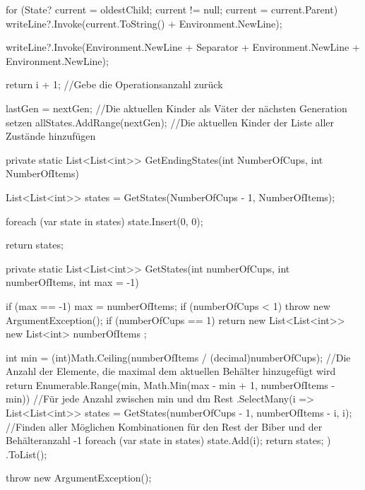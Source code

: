 \documentclass[a4paper,10pt,ngerman]{scrartcl}
\begin{document}
\begin{lstcs}
{{{{{                        for (State? current = oldestChild; current != null; current = current.Parent)
                        {
                            writeLine?.Invoke(current.ToString() + Environment.NewLine);
                        }
                    }

                    writeLine?.Invoke(Environment.NewLine + Separator + Environment.NewLine + Environment.NewLine);

                    return i + 1;               //Gebe die Operationsanzahl zurück
                }

                lastGen = nextGen;               //Die aktuellen Kinder als Väter der nächsten Generation setzen
                allStates.AddRange(nextGen);    //Die aktuellen Kinder der Liste aller Zustände hinzufügen
            }
        }

        private static List<List<int>> GetEndingStates(int NumberOfCups, int NumberOfItems)
        {
            List<List<int>> states = GetStates(NumberOfCups - 1, NumberOfItems);

            foreach (var state in states) state.Insert(0, 0);

            return states;
        }

        private static List<List<int>> GetStates(int numberOfCups, int numberOfItems, int max = -1)
        {
            if (max == -1) max = numberOfItems;
            if (numberOfCups < 1) throw new ArgumentException();
            if (numberOfCups == 1) return new List<List<int>> { new List<int> { numberOfItems } };

            int min = (int)Math.Ceiling(numberOfItems / (decimal)numberOfCups); //Die Anzahl der Elemente, die maximal dem aktuellen Behälter hinzugefügt wird
            return Enumerable.Range(min, Math.Min(max - min + 1, numberOfItems - min))  //Für jede Anzahl zwischen min und dm Rest
                .SelectMany(i =>
                {
                    List<List<int>> states = GetStates(numberOfCups - 1, numberOfItems - i, i); //Finden aller Möglichen Kombinationen für den Rest der Biber und der Behälteranzahl -1
                    foreach (var state in states) state.Add(i);
                    return states;
                })
                .ToList();

            throw new ArgumentException();
        }
    }
\end{lstcs}
\end{document}
